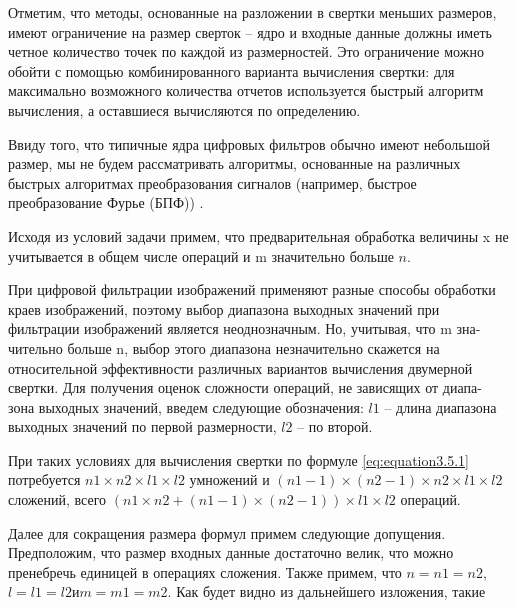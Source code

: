 
Отметим, что методы, основанные на разложении в свертки меньших размеров, имеют ограничение на размер сверток – ядро и входные данные должны иметь четное количество точек по каждой из размерностей. Это ограничение можно обойти с помощью комбинированного варианта вычисления свертки: для максимально возможного количества отчетов используется быстрый алгоритм вычисления, а оставшиеся вычисляются по определению.

Ввиду того, что типичные ядра цифровых фильтров обычно имеют небольшой размер, мы не будем рассматривать алгоритмы, основанные на различных быстрых алгоритмах преобразования сигналов (например, быстрое преобразование Фурье (БПФ)) \cite{Kalinovsky2016application, Digital_processing_Goldenberg_1985}.


Исходя из условий задачи примем, что предварительная обработка величины x не учитывается в общем числе операций и m значительно больше $n$.

При цифровой фильтрации изображений применяют разные способы обработки краев изображений, поэтому выбор диапазона выходных значений при фильтрации изображений является неоднозначным. Но, учитывая, что m зна-
чительно больше n, выбор этого диапазона незначительно скажется на относительной эффективности различных вариантов вычисления двумерной свертки. Для получения оценок сложности операций, не зависящих от диапа-
зона выходных значений, введем следующие обозначения: $l1$ – длина диапазона выходных значений по первой размерности, $l2$ – по второй.

При таких условиях для вычисления свертки по формуле \ref{eq:equation3.5.1} потребуется
$n1 \times n2 \times l1 \times l2$ умножений и $(n1 - 1) \times (n2 - 1) \times n2 \times l1 \times l2$ сложений, всего $(n1 \times n2 + (n1 - 1) \times (n2 - 1)) \times l1 \times l2$ операций.

Далее для сокращения размера формул примем следующие допущения.
Предположим, что размер входных данные достаточно велик, что можно пренебречь единицей в операциях сложения. Также примем, что $n = n1 = n2$,
$l = l1 = l2 и m = m1 = m2$. Как будет видно из дальнейшего изложения, такие

